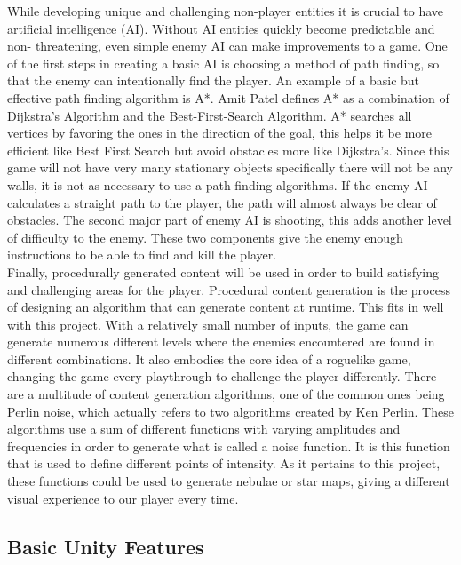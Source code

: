 \documentclass[12pt]{article}       %
\begin{document}
	While developing unique and challenging non-player entities it is crucial to have artificial intelligence (AI). Without AI entities quickly become predictable and non- threatening, even simple enemy AI can make improvements to a game. One of the first steps in creating a basic AI is choosing a method of path finding, so that the enemy can intentionally find the player. An example of a basic but effective path finding algorithm is A*. Amit Patel defines A* as a combination of Dijkstra’s Algorithm and the Best-First-Search Algorithm. A* searches all vertices by favoring the ones in the direction of the goal, this helps it be more efficient like Best First Search but avoid obstacles more like Dijkstra’s. \cite{A} Since this game will not have very many stationary objects specifically there will not be any walls, it is not as necessary to use a path finding algorithms. If the enemy AI calculates a straight path to the player, the path will almost always be clear of obstacles.  The second major part of enemy AI is shooting, this adds another level of difficulty to the enemy. These two components give the enemy enough instructions to be able to find and kill the player. \\

	Finally, procedurally generated content will be used in order to build satisfying and challenging areas for the player. Procedural content generation is the process of designing an algorithm that can generate content at runtime. This fits in well with this project. With a relatively small number of inputs, the game can generate numerous different levels where the enemies encountered are found in different combinations. It also embodies the core idea of a roguelike game, changing the game every playthrough to challenge the player differently. There are a multitude of content generation algorithms, one of the common ones being Perlin noise, which actually refers to two algorithms created by Ken Perlin. These algorithms use a sum of different functions with varying amplitudes and frequencies in order to generate what is called a noise function. It is this function that is used to define different points of intensity. As it pertains to this project, these functions could be used to generate nebulae or star maps, giving a different visual experience to our player every time. \cite{PCG}

\subsection{Basic Unity Features} %
\end{document}
